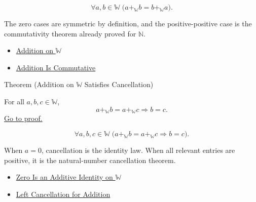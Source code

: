\begin{remark*}
\[
\forall a,b\in\mathbb{W}\;
\bigl(a+_{\mathbb{W}}b=b+_{\mathbb{W}}a\bigr).
\]
\end{remark*}

\begin{remark*}[Interpretation]
The zero cases are symmetric by definition, and the positive-positive case is
the commutativity theorem already proved for $\mathbb{N}$.
\end{remark*}

\begin{dependencies}
\begin{itemize}
  \item \hyperref[def:addition-on-w]{Addition on $\mathbb{W}$}
  \item \hyperref[thm:addition-commutative]{Addition Is Commutative}
\end{itemize}
\end{dependencies}

\begin{theorembox}{Theorem (Addition on \texorpdfstring{$\mathbb{W}$}{W} Satisfies Cancellation)}
\begin{theorem}
\label{thm:addition-on-w-cancellation}
For all $a,b,c\in\mathbb{W}$,
\[
a+_{\mathbb{W}}b=a+_{\mathbb{W}}c\Longrightarrow b=c.
\]
\hyperref[prf:addition-on-w-cancellation]{Go to proof.}
\end{theorem}
\end{theorembox}

\begin{remark*}
\[
\forall a,b,c\in\mathbb{W}\;
\bigl(a+_{\mathbb{W}}b=a+_{\mathbb{W}}c\Longrightarrow b=c\bigr).
\]
\end{remark*}

\begin{remark*}[Interpretation]
When $a=0$, cancellation is the identity law. When all relevant entries are
positive, it is the natural-number cancellation theorem.
\end{remark*}

\begin{dependencies}
\begin{itemize}
  \item \hyperref[thm:zero-additive-identity-on-w]{Zero Is an Additive Identity on $\mathbb{W}$}
  \item \hyperref[thm:addition-left-cancellation]{Left Cancellation for Addition}
\end{itemize}
\end{dependencies}
